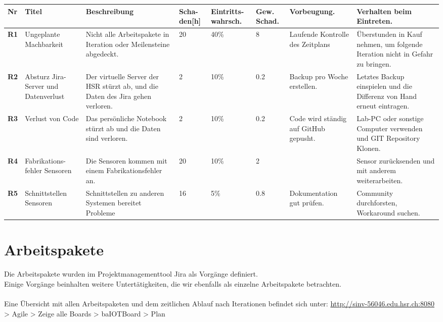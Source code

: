 \begin{landscape}
	\begin{tabularx}{\linewidth}{lp{2cm}Xp{1cm}p{1.5cm}p{1.5cm}XX}
		\textbf{Nr}	& \textbf{Titel} & \textbf{Beschreibung} & \textbf{Scha-den[h]} & \textbf{Eintritts-wahrsch.} & \textbf{Gew. Schad.} & \textbf{Vorbeugung.} & \textbf{Verhalten beim Eintreten.}
		\\ \hline
			\textbf{R1} &
			Ungeplante Machbarkeit &
			Nicht alle Arbeitspakete in Iteration oder Meilensteine abgedeckt. &
			20 & 40\% & 8 & Laufende Kontrolle des Zeitplans &
			Überstunden in Kauf nehmen, um folgende Iteration nicht in Gefahr zu bringen.
		\\ \hline
			\textbf{R2} &
			Absturz Jira-Server und Datenverlust &
			Der virtuelle Server der HSR stürzt ab, und die Daten des Jira gehen verloren. &
			2 &
			10\% &
			0.2 &
			Backup pro Woche erstellen. &
			Letztes Backup einspielen und die Differenz von Hand erneut eintragen.
		\\ \hline
			\textbf{R3} &
			Verlust von Code &
			Das persönliche Notebook stürzt ab und die Daten sind verloren. &
			2 &
			10\% &
			0.2 &
			Code wird ständig auf GitHub gepusht. &
			Lab-PC oder sonstige Computer verwenden und GIT Repository Klonen.
		\\ \hline
			\textbf{R4} &
			Fabrikations-fehler Sensoren &
			Die Sensoren kommen mit einem Fabrikationsfehler an. &
			20 &
			10\% &
			2 &
			  &
			Sensor zurücksenden und mit anderem weiterarbeiten.
		\\ \hline
			\textbf{R5} &
			Schnittstellen Sensoren &
			Schnittstellen zu anderen Systemen bereitet Probleme &
			16 &
			5\% &
			0.8 &
			Dokumentation gut prüfen. &
			Community durchforsten, Workaround suchen.
		\\ \hline
	\end{tabularx}
\end{landscape}

\section*{Arbeitspakete}
	Die Arbeitspakete wurden im Projektmanagementtool Jira als Vorgänge definiert. \\
	Einige Vorgänge beinhalten weitere Untertätigkeiten, die wir ebenfalls als einzelne Arbeitspakete betrachten. \\
	\\
	Eine Übersicht mit allen Arbeitspaketen und dem zeitlichen Ablauf nach Iterationen befindet sich unter: \url{http://sinv-56046.edu.hsr.ch:8080} > Agile > Zeige alle Boards > baIOTBoard > Plan

